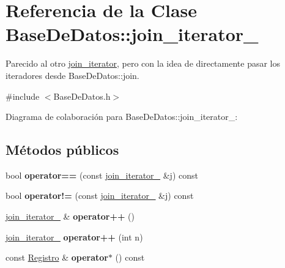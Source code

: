 \hypertarget{classBaseDeDatos_1_1join__iterator__2}{}\section{Referencia de la Clase Base\+De\+Datos\+:\+:join\+\_\+iterator\+\_}
\label{classBaseDeDatos_1_1join__iterator__2}


Parecido al otro \mbox{\hyperlink{classBaseDeDatos_1_1join__iterator}{join\+\_\+iterator}}, pero con la idea de directamente pasar los iteradores desde Base\+De\+Datos\+::join.  




{\ttfamily \#include $<$Base\+De\+Datos.\+h$>$}



Diagrama de colaboración para Base\+De\+Datos\+:\+:join\+\_\+iterator\+\_\+:
\subsection*{Métodos públicos}
\begin{DoxyCompactItemize}
\item 
\mbox{\label{classBaseDeDatos_1_1join__iterator__2_aff1cf476c676fdd5c25e17c488d82bee}} 
bool {\bfseries operator==} (const \mbox{\hyperlink{classBaseDeDatos_1_1join__iterator__2}{join\+\_\+iterator\+\_}} \&j) const
\item 
\mbox{\label{classBaseDeDatos_1_1join__iterator__2_a71711bc583d1737e4aec219c410296fe}} 
bool {\bfseries operator!=} (const \mbox{\hyperlink{classBaseDeDatos_1_1join__iterator__2}{join\+\_\+iterator\+\_}} \&j) const
\item 
\mbox{\label{classBaseDeDatos_1_1join__iterator__2_a864f33fa6b91e697c522dc911dc369b1}} 
\mbox{\hyperlink{classBaseDeDatos_1_1join__iterator__2}{join\+\_\+iterator\+\_}} \& {\bfseries operator++} ()
\item 
\mbox{\label{classBaseDeDatos_1_1join__iterator__2_abd169306d727f7a478e75783bdef42c3}} 
\mbox{\hyperlink{classBaseDeDatos_1_1join__iterator__2}{join\+\_\+iterator\+\_}} {\bfseries operator++} (int n)
\item 
\mbox{\label{classBaseDeDatos_1_1join__iterator__2_a474dc4b1a11400e3e45830caab537770}} 
const \mbox{\hyperlink{classRegistro}{Registro}} \& {\bfseries operator$\ast$} () const
\end{DoxyCompactItemize}
